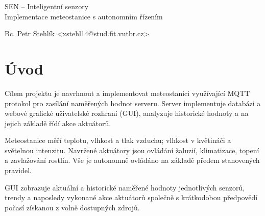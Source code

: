 \documentclass[11pt,a4paper]{article}
\begin{document}
\begin{center}
	\LARGE{SEN -- Inteligentní senzory}\\
	\Large{Implementace meteostanice s autonomním řízením}
	\vspace{0.5cm}

    \begin{centering}
        \small{Bc. Petr Stehlík <xstehl14@stud.fit.vutbr.cz>}
    \end{centering}


	\vspace{0.2cm}

\end{center}

\section{Úvod}
Cílem projektu je navrhnout a implementovat meteostanici využívající MQTT protokol pro zasílání naměřených hodnot serveru. Server implementuje databázi a webové grafické uživatelské rozhraní (GUI), analyzuje historické hodnoty a na jejich základě řídí akce aktuátorů.

Meteostanice měří teplotu, vlhkost a tlak vzduchu; vlhkost v květináči a světelnou intenzitu. Navržené aktuátory jsou ovládání žaluzií, klimatizace, topení a zavlažování rostlin. Vše je autonomně ovládáno na základě předem stanovených pravidel.

GUI zobrazuje aktuální a historické naměřené hodnoty jednotlivých senzorů, trendy a naposledy vykonané akce aktuátorů společně s krátkodobou předpovědí počasí získanou z volně dostupných zdrojů.
\end{document}

